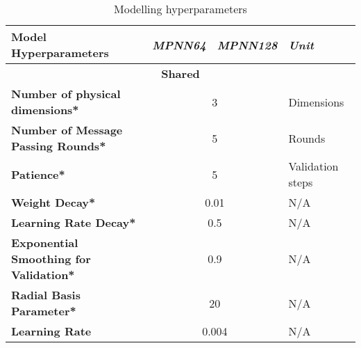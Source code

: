 \begin{table}[H]
    \centering
    \caption{Modelling hyperparameters}
    \label{tab:hyperparameters}
    \begin{tabular}{|lcll|}
        \hline
        \multicolumn{1}{|l|}{\textbf{Model Hyperparameters}}                 & \multicolumn{1}{l|}{\textit{\textbf{MPNN64}}} & \multicolumn{1}{l|}{\textit{\textbf{MPNN128}}} & \textit{\textbf{Unit}} \\ \hline
        \multicolumn{4}{|c|}{\textbf{Shared}}                                                                                                                                                          \\ \hline
        \multicolumn{1}{|l|}{\textbf{Number of physical dimensions*}}        & \multicolumn{2}{c|}{3}                        & Dimensions                                                              \\ \hline
        \multicolumn{1}{|l|}{\textbf{Number of Message Passing Rounds*}}     & \multicolumn{2}{c|}{5}                        & Rounds                                                                  \\ \hline
        \multicolumn{1}{|l|}{\textbf{Patience*}}                             & \multicolumn{2}{c|}{5}                        & Validation steps                                                        \\ \hline
        \multicolumn{1}{|l|}{\textbf{Weight Decay*}}                         & \multicolumn{2}{c|}{0.01}                     & N/A                                                                     \\ \hline
        \multicolumn{1}{|l|}{\textbf{Learning Rate Decay*}}                  & \multicolumn{2}{c|}{0.5}                      & N/A                                                                     \\ \hline
        \multicolumn{1}{|l|}{\textbf{Exponential Smoothing for Validation*}} & \multicolumn{2}{c|}{0.9}                      & N/A                                                                     \\ \hline
        \multicolumn{1}{|l|}{\textbf{Radial Basis Parameter*}}               & \multicolumn{2}{c|}{20}                       & N/A                                                                     \\ \hline
        \multicolumn{1}{|l|}{\textbf{Learning Rate}}                         & \multicolumn{2}{c|}{0.004}                    & N/A                                                                     \\ \hline

\end{tabular}
\end{table}
